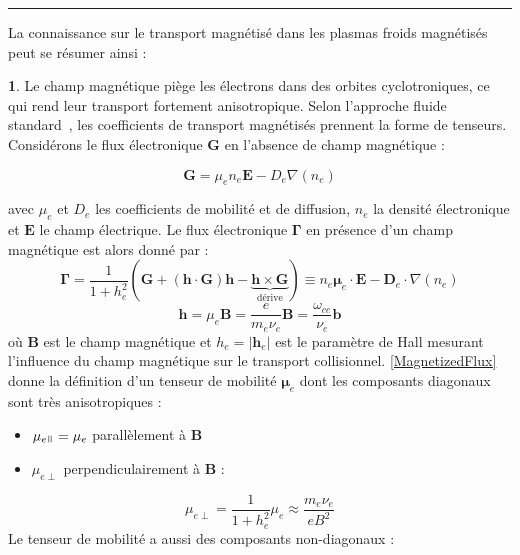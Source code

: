 \begin{refsection}
\begin{center}
\rule{0.5\textwidth}{1pt}
\end{center}


La connaissance sur le transport magnétisé dans les plasmas froids magnétisés
peut se résumer ainsi :

\textbf{1}. Le champ magnétique piège les électrons dans des orbites
cyclotroniques, ce qui rend leur transport fortement anisotropique. Selon
l'approche fluide standard~\parencite{Chen,Rozhansky,Lieberman,Rax}, les
coefficients de transport magnétisés prennent la forme de
tenseurs.
Considérons le flux électronique $\mathbf G$ en l'absence de champ magnétique :

\begin{equation}
\mathbf G = \mu_e n_e\mathbf E - D_e\nabla(n_e)
\end{equation}

avec $\mu_e$ et $D_e$ les coefficients de mobilité et de diffusion, $n_e$ la
densité électronique et $\mathbf E$ le champ électrique. Le flux
électronique $\boldsymbol{\Gamma}$ en présence d'un champ magnétique est alors
donné par :
\begin{equation}
\label{MagnetizedFlux}
\boldsymbol{\Gamma} = \frac{1}{1+h_e^2}(\mathbf G + (\mathbf
h\cdot\mathbf G)\mathbf h-\underbrace{\mathbf h\times\mathbf
G}_\text{dérive})\equiv n_e\boldsymbol{\mu}_e\cdot\mathbf
E-\mathbf{D}_e\cdot\nabla(n_e)
\end{equation}
\begin{equation}
\mathbf h=\mu_e\mathbf B=\frac{e}{m_e\nu_e}\mathbf
B=\frac{\omega_{ce}}{\nu_e}\mathbf b
\end{equation}
où $\mathbf B$ est le champ magnétique et $h_e=|\mathbf h_e|$ est le paramètre
de Hall mesurant l'influence du champ
magnétique sur le transport collisionnel. \eqref{MagnetizedFlux} donne la
définition d'un tenseur de mobilité $\boldsymbol{\mu}_e$ dont les composants
diagonaux sont très anisotropiques :
 
\begin{itemize}
  \item $\mu_{e\para}=\mu_e$ parallèlement à $\mathbf B$
  \item $\mu_{e\perp}$ perpendiculairement à $\mathbf B$ :
\end{itemize}

\begin{equation}
\mu_{e\perp}=\frac{1}{1+h_e^2}\mu_e\approx\frac{m_e\nu_e}{eB^2}
\end{equation}
Le tenseur de mobilité a aussi des composants non-diagonaux :


\end{refsection}
